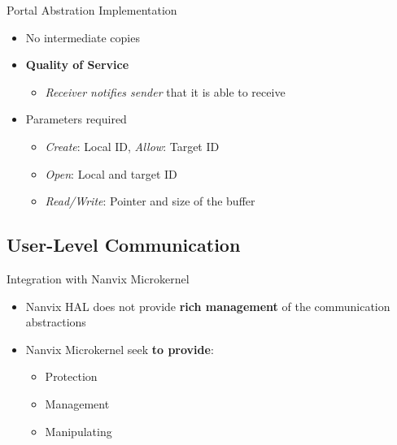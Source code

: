 		\begin{frame}[fragile]{Portal Abstration Implementation}
			\begin{itemize}
				\item No intermediate copies
				\item \textbf{Quality of Service}
				\begin{itemize}
					\item \textit{Receiver notifies sender} that it is able to receive
				\end{itemize}
				\item Parameters required
				\begin{itemize}
					\item \textit{Create}: Local ID, \textit{Allow}: Target ID
					\item \textit{Open}: Local and target ID
					\item \textit{Read/Write}: Pointer and size of the buffer
				\end{itemize}
			\end{itemize}


		\end{frame}

	\subsection{User-Level Communication}

		\begin{frame}[fragile]{Integration with Nanvix Microkernel}
			\begin{itemize}
				\item Nanvix HAL does not provide \textbf{rich management} of the communication abstractions
				\item Nanvix Microkernel seek \textbf{to provide}:
				\begin{itemize}
					\item Protection
					\item Management
					\item Manipulating
				\end{itemize}
			\end{itemize}

		\end{frame}

